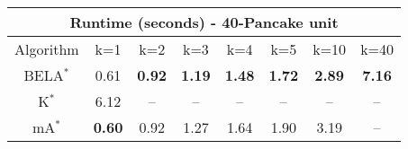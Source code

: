 \begin{tabular}{c|ccccccc}\toprule
\multicolumn{8}{c}{Runtime (seconds) - 40-Pancake unit}\\ \midrule
Algorithm & k=1 & k=2 & k=3 & k=4 & k=5 & k=10 & k=40 \\ \midrule
BELA$^*$ & 0.61 & \textbf{0.92} & \textbf{1.19} & \textbf{1.48} & \textbf{1.72} & \textbf{2.89} & \textbf{7.16} \\
K$^*$ & 6.12 & -- & -- & -- & -- & -- & -- \\
mA$^*$ & \textbf{0.60} & 0.92 & 1.27 & 1.64 & 1.90 & 3.19 & -- \\ \bottomrule 
\end{tabular}
